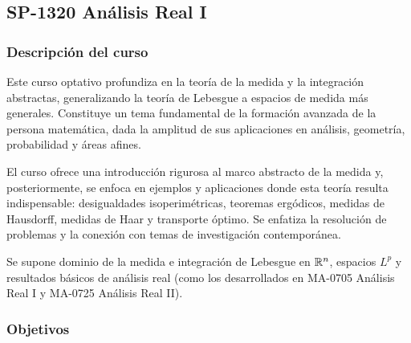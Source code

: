 \newpage
\subsection*{SP-1320 Análisis Real I}

\hypertarget{SP1320}{}
\begin{refsection}
\begin{table}[H]
\end{table}

\subsubsection*{Descripción del curso}

Este curso optativo profundiza en la teoría de la medida y la integración abstractas, generalizando la teoría de Lebesgue a espacios de medida más generales. Constituye un tema fundamental de la formación avanzada de la persona matemática, dada la amplitud de sus aplicaciones en análisis, geometría, probabilidad y áreas afines.

El curso ofrece una introducción rigurosa al marco abstracto de la medida y, posteriormente, se enfoca en ejemplos y aplicaciones donde esta teoría resulta indispensable: desigualdades isoperimétricas, teoremas ergódicos, medidas de Hausdorff, medidas de Haar y transporte óptimo. Se enfatiza la resolución de problemas y la conexión con temas de investigación contemporánea.

Se supone dominio de la medida e integración de Lebesgue en $\mathbb{R}^n$, espacios $L^p$ y resultados básicos de análisis real (como los desarrollados en MA-0705 Análisis Real I y MA-0725 Análisis Real II).

\subsubsection*{Objetivos}


\end{refsection}
